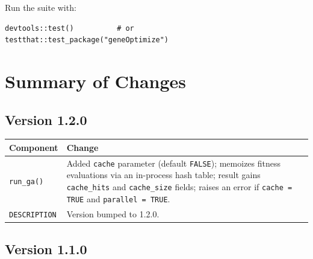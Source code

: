 \documentclass[11pt,a4paper]{article}
\begin{document}
Run the suite with:

\begin{lstlisting}
devtools::test()          # or
testthat::test_package("geneOptimize")
\end{lstlisting}

\section{Summary of Changes}

\subsection*{Version 1.2.0}

\begin{center}
\begin{tabular}{p{3.5cm}p{9.5cm}}
  \toprule
  \textbf{Component} & \textbf{Change} \\
  \midrule
  \texttt{run\_ga()} &
    Added \texttt{cache} parameter (default \texttt{FALSE}); memoizes
    fitness evaluations via an in-process hash table; result gains
    \texttt{cache\_hits} and \texttt{cache\_size} fields; raises an error
    if \texttt{cache = TRUE} and \texttt{parallel = TRUE}. \\[4pt]
  \texttt{DESCRIPTION} &
    Version bumped to 1.2.0. \\
  \bottomrule
\end{tabular}
\end{center}

\subsection*{Version 1.1.0}
\end{document}

